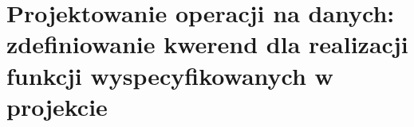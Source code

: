 \section{Projektowanie operacji na danych: zdefiniowanie kwerend dla realizacji funkcji wyspecyfikowanych w projekcie}


